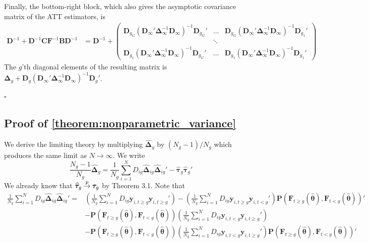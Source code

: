 \documentclass[12pt]{article}
\begin{document}
Finally, the bottom-right block, which also gives the asymptotic covariance matrix of the ATT estimators, is 
\begin{align*}
    \bm D^{-1} + \bm D^{-1} \bm C \bm{F}^{-1} \bm B \bm D^{-1} 
    &= \bm D^{-1} + 
    \begin{pmatrix}
        \bm D_{g_G} (\bm D_{\infty}' \bm \Delta_{\infty}^{-1} \bm D_{\infty})^{-1} \bm D_{g_G}' & \hdots & \bm D_{g_G} (\bm D_{\infty}' \bm \Delta_{\infty}^{-1} \bm D_{\infty})^{-1} \bm D_{g_1}'\\
        & \ddots &\\
        \bm D_{g_1} (\bm D_{\infty}' \bm \Delta_{\infty}^{-1} \bm D_{\infty})^{-1} \bm D_{g_G}' & \hdots & \bm D_{g_1} (\bm D_{\infty}' \bm \Delta_{\infty}^{-1} \bm D_{\infty})^{-1} \bm D_{g_1}'
    \end{pmatrix}
\end{align*}
The $g$'th diagonal elements of the resulting matrix is $\bm \Delta_g + \bm D_g (\bm D_{\infty}' \bm \Delta_{\infty}^{-1} \bm D_{\infty})^{-1} \bm D_g'$.




$\square$




\subsection*{Proof of \autoref{theorem:nonparametric_variance}}

We derive the limiting theory by multiplying $\widehat{\bm \Delta}_g$ by $(N_g-1)/N_g$ which produces the same limit as $N \rightarrow \infty$. We write
\begin{equation*}
    \frac{N_g - 1}{ N_g} \widehat{\bm \Delta}_g = \frac{1}{N_g} \sum_{i = 1}^N D_{ig} \widehat{\bm \Delta}_{ig} \widehat{\bm \Delta}_{ig}' - \widehat{\bm \tau}_g \widehat{\bm \tau}_g'
\end{equation*}
We already know that $\widehat{\bm \tau}_g \mathbin{\overset{p}{\to}} \bm \tau_g$ by Theorem 3.1. Note that 
\begin{align*}
    \frac{1}{N_g} \sum_{i = 1}^N D_{ig} \widehat{\bm \Delta}_{ig} \widehat{\bm \Delta}_{ig}' = &\left( \frac{1}{N_g} \sum_{i = 1}^N D_{ig}  \bm y_{i, t \geq g} \bm y_{i, t \geq g}' \right) - \left( \frac{1}{N_g} \sum_{i = 1}^N D_{ig} \bm y_{i, t \geq g} \bm y_{i, t < g}' \right) \bm P(\bm{F}_{t \geq g}(\widehat{\bm{\theta}}), \bm{F}_{t < g}(\widehat{\bm{\theta}}))'\\
    &- \bm P(\bm{F}_{t \geq g}(\widehat{\bm{\theta}}), \bm{F}_{t < g}(\widehat{\bm{\theta}})) \left( \frac{1}{N_g} \sum_{i = 1}^N D_{ig} \bm y_{i, t < g} \bm y_{i, t \geq g}' \right)\\
    &- \bm P(\bm{F}_{t \geq g}(\widehat{\bm{\theta}}), \bm{F}_{t < g}(\widehat{\bm{\theta}})) \left( \frac{1}{N_g} \sum_{i = 1}^N D_{ig}  \bm y_{i, t < g} \bm y_{i, t \geq g}' \right) \bm P(\bm{F}_{t \geq g}(\widehat{\bm{\theta}}), \bm{F}_{t < g}(\widehat{\bm{\theta}}))'
\end{align*} 
\end{document}
